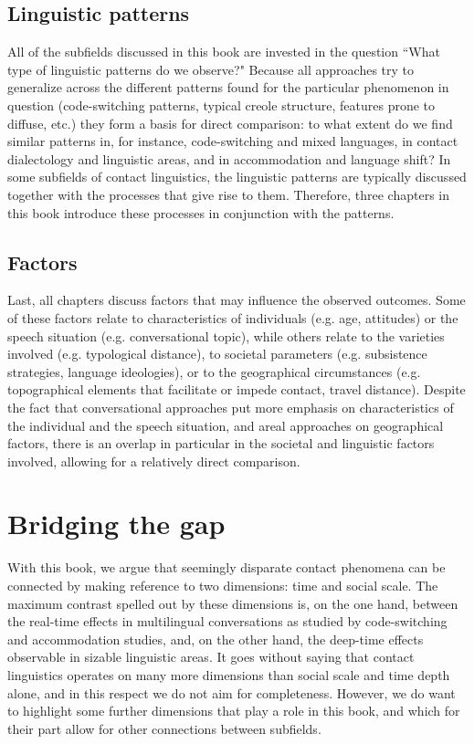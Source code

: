 \documentclass[output=paper]{langscibook}
\begin{document}
\subsection{Linguistic patterns}
All of the subfields discussed in this book are invested in the question ``What type of linguistic patterns do we observe?" Because all approaches try to generalize across the different patterns found for the particular phenomenon in question (code-switching patterns, typical creole structure, features prone to diffuse, etc.) they form a basis for direct comparison: to what extent do we find similar patterns in, for instance, code-switching and mixed languages, in contact dialectology and linguistic areas, and in accommodation and language shift? In some subfields of contact linguistics, the linguistic patterns are typically discussed together with the processes that give rise to them. Therefore, three chapters in this book introduce these processes in conjunction with the patterns.


\subsection{Factors}
Last, all chapters discuss factors that may influence the observed outcomes. Some of these factors relate to characteristics of individuals (e.g. age, attitudes) or the speech situation (e.g. conversational topic), while others relate to the varieties involved (e.g. typological distance), to societal parameters (e.g. subsistence strategies, language ideologies), or to the geographical circumstances (e.g. topographical elements that facilitate or impede contact, travel distance). Despite the fact that conversational approaches put more emphasis on characteristics of the individual and the speech situation, and areal approaches on geographical factors, there is an overlap in particular in the societal and linguistic factors involved, allowing for a relatively direct comparison.

\section{Bridging the gap} \label{bridging}

With this book, we argue that seemingly disparate contact phenomena can be connected by making reference to two dimensions: time and social scale. The maximum contrast spelled out by these dimensions is, on the one hand, between the real-time effects in multilingual conversations as studied by code-switching and accommodation studies, and, on the other hand, the deep-time effects observable in sizable linguistic areas. It goes without saying that contact linguistics operates on many more dimensions than social scale and time depth alone, and in this respect we do not aim for completeness. However, we do want to highlight some further dimensions that play a role in this book, and which for their part allow for other connections between subfields.
\end{document}
